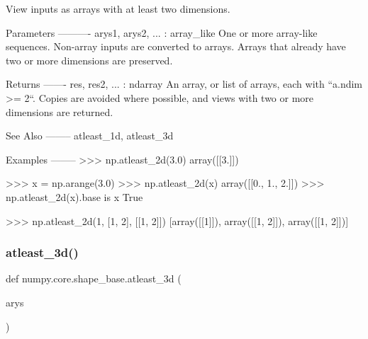 \begin{DoxyVerb}View inputs as arrays with at least two dimensions.

Parameters
----------
arys1, arys2, ... : array_like
    One or more array-like sequences.  Non-array inputs are converted
    to arrays.  Arrays that already have two or more dimensions are
    preserved.

Returns
-------
res, res2, ... : ndarray
    An array, or list of arrays, each with ``a.ndim >= 2``.
    Copies are avoided where possible, and views with two or more
    dimensions are returned.

See Also
--------
atleast_1d, atleast_3d

Examples
--------
>>> np.atleast_2d(3.0)
array([[3.]])

>>> x = np.arange(3.0)
>>> np.atleast_2d(x)
array([[0., 1., 2.]])
>>> np.atleast_2d(x).base is x
True

>>> np.atleast_2d(1, [1, 2], [[1, 2]])
[array([[1]]), array([[1, 2]]), array([[1, 2]])]\end{DoxyVerb}
 \mbox{\label{namespacenumpy_1_1core_1_1shape__base_a8bef53fc0dc78f353b9f5fa24ad37d62}} 
\subsubsection{\texorpdfstring{atleast\+\_\+3d()}{atleast\_3d()}}
{\footnotesize\ttfamily def numpy.\+core.\+shape\+\_\+base.\+atleast\+\_\+3d (\begin{DoxyParamCaption}\item[{}]{arys }\end{DoxyParamCaption})}

